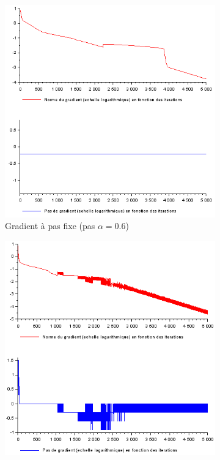 \documentclass{article}
\begin{document}
        \begin{figure}
            \begin{subfigure}[t]{0.4\textwidth}
                \includegraphics[width=\textwidth]{../Images/Pas_fixe_dual.png}
                \caption{Gradient à pas fixe (pas $\alpha = 0.6$)}
                \label{fig:pas_fixe_dual}
            \end{subfigure}
            \hfill
            \begin{subfigure}[t]{.4\textwidth}
                \includegraphics[width=\textwidth]{../Images/Pas_variable_dual.png}

\end{subfigure}
\end{figure}
\end{document}
